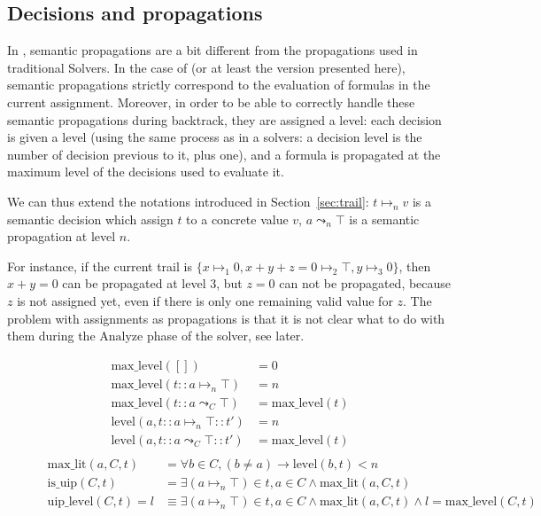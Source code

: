 \documentclass{article}
\begin{document}
\subsection{Decisions and propagations}

In \mcsat{}, semantic propagations are a bit different from the propagations
used in traditional \smt{} Solvers. In the case of \mcsat{} (or at least the version presented here),
semantic propagations strictly correspond to the evaluation of formulas in the
current assignment. Moreover, in order to be able to correctly handle these semantic
propagations during backtrack, they are assigned a level: each decision is given a level
(using the same process as in a \sat{} solvers: a decision level is the number of decision
previous to it, plus one), and a formula is propagated at the maximum level of the decisions
used to evaluate it.

We can thus extend the notations introduced in Section~\ref{sec:trail}: $t \mapsto_n v$ is
a semantic decision which assign $t$ to a concrete value $v$, $a \leadsto_n \top$ is a
semantic propagation at level $n$.

For instance, if the current trail is $\{x \mapsto_1 0, x + y + z = 0 \mapsto_2 \top, y\mapsto_3 0\}$,
then $x + y = 0$ can be propagated at level $3$, but $z = 0$ can not be propagated, because
$z$ is not assigned yet, even if there is only one remaining valid value for $z$.
The problem with assignments as propagations is that it is not clear what to do with
them during the $\text{Analyze}$ phase of the solver, see later.

\begin{figure}
  \begin{center}
    \begin{align*}
      \text{max\_level}([]) &= 0 \\
      \text{max\_level}(t :: a \mapsto_n \top) &= n \\
      \text{max\_level}(t :: a \leadsto_C \top) &= \text{max\_level}(t) \\
      \text{level}(a, t :: a \mapsto_n \top :: t')  &= n \\
      \text{level}(a, t :: a \leadsto_C \top :: t') &= \text{max\_level}(t) \\
    \end{align*}
    \begin{align*}
      \text{max\_lit}(a, C, t) &= \forall b \in C, (b \neq a) \rightarrow
                                    \text{level}(b, t) < n \\
      \text{is\_uip}(C, t) &= \exists (a \mapsto_n \top) \in t,
                                a \in C \land \text{max\_lit}(a, C, t) \\
      \text{uip\_level}(C, t) = l &\equiv \exists (a \mapsto_n \top) \in t,
                                            a \in C \land \text{max\_lit}(a, C, t)
                                            \land l = \text{max\_level}(C, t) \\
    \end{align*}
  \end{center}
  \caption{}\label{fig:analyze_functions}
\end{figure}
\end{document}

